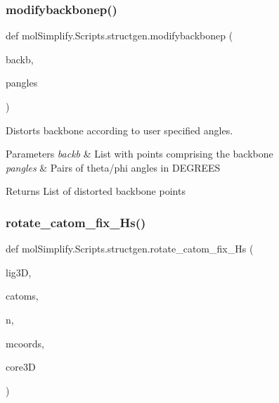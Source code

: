 \subsubsection{\texorpdfstring{modifybackbonep()}{modifybackbonep()}}
{\footnotesize\ttfamily def mol\+Simplify.\+Scripts.\+structgen.\+modifybackbonep (\begin{DoxyParamCaption}\item[{}]{backb,  }\item[{}]{pangles }\end{DoxyParamCaption})}



Distorts backbone according to user specified angles. 


\begin{DoxyParams}{Parameters}
{\em backb} & List with points comprising the backbone \\
\hline
{\em pangles} & Pairs of theta/phi angles in D\+E\+G\+R\+E\+ES \\
\hline
\end{DoxyParams}
\begin{DoxyReturn}{Returns}
List of distorted backbone points 
\end{DoxyReturn}
\mbox{\label{namespacemolSimplify_1_1Scripts_1_1structgen_a9c4c45a6c8757db294e57137c875b848}} 
\subsubsection{\texorpdfstring{rotate\+\_\+catom\+\_\+fix\+\_\+\+Hs()}{rotate\_catom\_fix\_Hs()}}
{\footnotesize\ttfamily def mol\+Simplify.\+Scripts.\+structgen.\+rotate\+\_\+catom\+\_\+fix\+\_\+\+Hs (\begin{DoxyParamCaption}\item[{}]{lig3D,  }\item[{}]{catoms,  }\item[{}]{n,  }\item[{}]{mcoords,  }\item[{}]{core3D }\end{DoxyParamCaption})}



